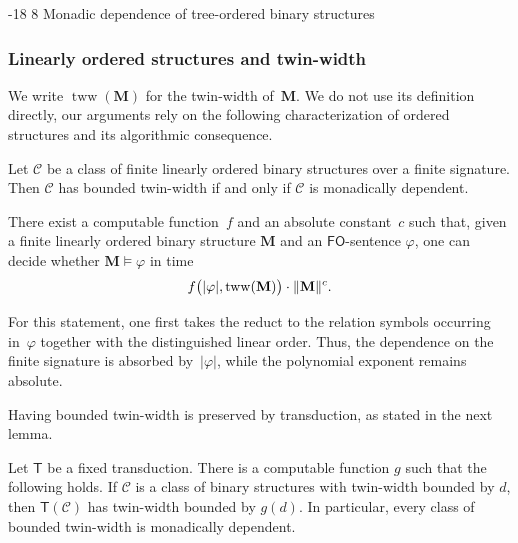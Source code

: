 \documentclass[1p,number,11pt]{elsarticle}
\makeatletter
\renewcommand\subsection{\@startsection{subsection}{2}{\z@}%
  {-18\p@ \@plus -4\p@ \@minus -4\p@}%
  {8\p@ \@plus 4\p@ \@minus 4\p@}%
  {\normalfont\normalsize\bfseries}}
\renewcommand{\phi}{\varphi}
\theoremstyle{plain}
\newcommand{\Cc}{\mathscr{C}}
\renewcommand{\FO}{\ensuremath{\mathsf{FO}}}
\makeatother
\begin{document}
\subsection{Monadic dependence of tree-ordered binary structures}
\subsubsection{Linearly ordered structures and twin-width}

We write $\operatorname{tww}(\mathbf M)$ for the twin-width of~$\mathbf M$. We do not use its definition directly, our arguments rely on the following characterization of ordered structures and its algorithmic consequence.

\begin{theorem}[store=thm:characterization-tww,note={\cite[Theorem 3]{bonnet2024twin}}]
    Let $\Cc$ be a class of finite linearly ordered binary structures over a finite signature. Then $\Cc$ has bounded twin-width if and only if $\Cc$ is monadically dependent.
\end{theorem}

\begin{theorem}[
store=thm:mc-tww,
note={\cite[Theorem~2]{bonnet2024twin} and
\cite[Theorem~1]{bonnet2022twwI}}]
There exist a computable function~$f$ and an absolute constant~$c$ such that,
given a finite linearly ordered binary structure $\mathbf M$ and an
$\FO$-sentence $\phi$, one can decide whether
$\mathbf M\models\phi$ in time
\[
 f\bigl(|\phi|,{\rm tww}(\mathbf M)\bigr)\cdot\|\mathbf M\|^c.
\]
\end{theorem}

For this statement, one first takes the reduct to the relation symbols
occurring in~$\phi$ together with the distinguished linear order.  Thus, the
dependence on the finite signature is absorbed by~$|\phi|$, while the
polynomial exponent remains absolute.

Having bounded twin-width is preserved by transduction, as stated in the next lemma.

\begin{lemma}
    \label{lem:tww-preserved}
    Let $\mathsf T$ be a fixed transduction. 
    There is a computable function $g$ such that the following holds. 
    If $\Cc$ is a class of binary structures with twin-width bounded by $d$, then $\mathsf T(\Cc)$ has twin-width bounded by $g(d)$. 
    In particular, every class of bounded twin-width is monadically dependent. 
\end{lemma}
\end{document}
